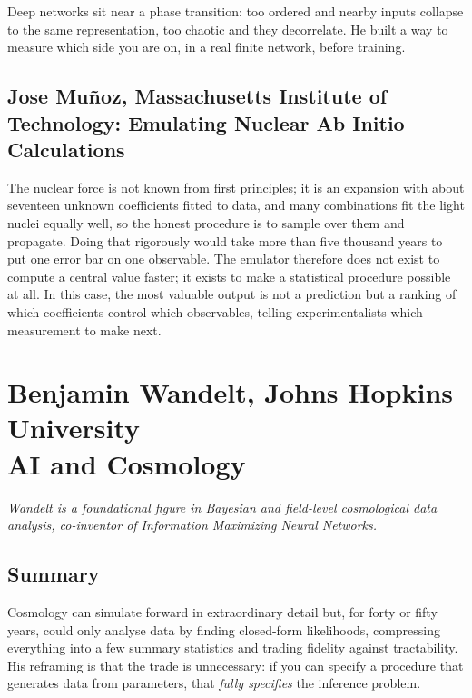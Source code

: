 \documentclass[11pt]{article}
\begin{document}
Deep networks sit near a phase transition: too ordered and nearby inputs collapse to the same representation, too chaotic and they decorrelate. He built a way to measure which side you are on, in a real finite network, before training.

\subsection*{Jose Mu\~noz, Massachusetts Institute of Technology: Emulating Nuclear Ab Initio Calculations}

The nuclear force is not known from first principles; it is an expansion with about seventeen unknown coefficients fitted to data, and many combinations fit the light nuclei equally well, so the honest procedure is to sample over them and propagate. Doing that rigorously would take more than five thousand years to put one error bar on one observable. The emulator therefore does not exist to compute a central value faster; it exists to make a statistical procedure possible at all. In this case, the most valuable output is not a prediction but a ranking of which coefficients control which observables, telling experimentalists which measurement to make next.

\section{Benjamin Wandelt, Johns Hopkins University\\
{\large AI and Cosmology}}

\emph{Wandelt is a foundational figure in Bayesian and field-level cosmological data analysis, co-inventor of Information Maximizing Neural Networks.}

\subsection*{Summary}
Cosmology can simulate forward in extraordinary detail but, for forty or fifty years, could only analyse data by finding closed-form likelihoods, compressing everything into a few summary statistics and trading fidelity against tractability. His reframing is that the trade is unnecessary: if you can specify a procedure that generates data from parameters, that \emph{fully specifies} the inference problem.
\end{document}
